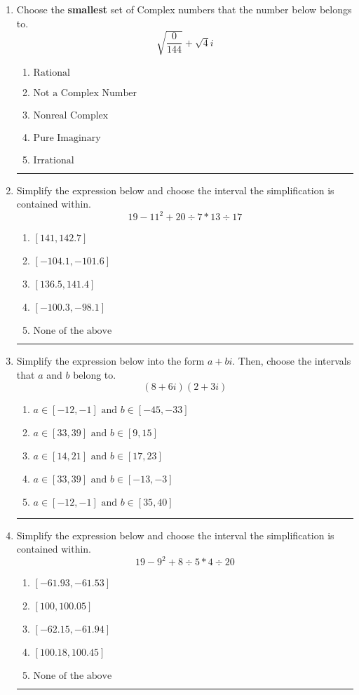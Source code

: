 \documentclass[14pt]{extbook}
\newcommand{\litem}[1]{\item#1\hspace*{-1cm}\rule{\textwidth}{0.4pt}}
\begin{document}
\begin{enumerate}
\litem{
Choose the \textbf{smallest} set of Complex numbers that the number below belongs to.\[ \sqrt{\frac{0}{144}}+\sqrt{4}i \]\begin{enumerate}[label=\Alph*.]
\item \( \text{Rational} \)
\item \( \text{Not a Complex Number} \)
\item \( \text{Nonreal Complex} \)
\item \( \text{Pure Imaginary} \)
\item \( \text{Irrational} \)

\end{enumerate} }
\litem{
Simplify the expression below and choose the interval the simplification is contained within.\[ 19 - 11^2 + 20 \div 7 * 13 \div 17 \]\begin{enumerate}[label=\Alph*.]
\item \( [141, 142.7] \)
\item \( [-104.1, -101.6] \)
\item \( [136.5, 141.4] \)
\item \( [-100.3, -98.1] \)
\item \( \text{None of the above} \)

\end{enumerate} }
\litem{
Simplify the expression below into the form $a+bi$. Then, choose the intervals that $a$ and $b$ belong to.\[ (8 + 6 i)(2 + 3 i) \]\begin{enumerate}[label=\Alph*.]
\item \( a \in [-12, -1] \text{ and } b \in [-45, -33] \)
\item \( a \in [33, 39] \text{ and } b \in [9, 15] \)
\item \( a \in [14, 21] \text{ and } b \in [17, 23] \)
\item \( a \in [33, 39] \text{ and } b \in [-13, -3] \)
\item \( a \in [-12, -1] \text{ and } b \in [35, 40] \)

\end{enumerate} }
\litem{
Simplify the expression below and choose the interval the simplification is contained within.\[ 19 - 9^2 + 8 \div 5 * 4 \div 20 \]\begin{enumerate}[label=\Alph*.]
\item \( [-61.93, -61.53] \)
\item \( [100, 100.05] \)
\item \( [-62.15, -61.94] \)
\item \( [100.18, 100.45] \)
\item \( \text{None of the above} \)


\end{enumerate}}
\end{enumerate}
\end{document}
